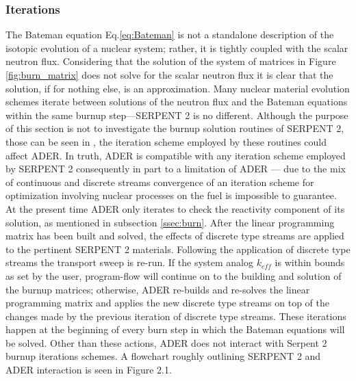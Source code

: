 \subsubsection{Iterations} \label{sssec:iter}
The Bateman equation Eq.\ref{eq:Bateman} is not a standalone description of the
isotopic evolution of a nuclear system; rather, it is tightly coupled with the
scalar neutron flux. Considering that the solution of the system of matrices
in Figure \ref{fig:burn_matrix} does not solve for the scalar neutron flux
it is clear that the solution, if for nothing else, is an approximation. Many
nuclear material evolution schemes iterate between solutions of the neutron
flux and the Bateman equations within the same burnup step---SERPENT 2 is no 
different. Although the purpose of
this section is not to investigate the burnup solution routines of SERPENT 2, 
those
can be seen in \cite{leppanen_burnup_2009}, the iteration scheme employed by
these routines could affect ADER. In truth, ADER is compatible with any
iteration scheme employed by SERPENT 2 consequently in part to a limitation 
of ADER ---
due to the mix of continuous and discrete streams convergence of an iteration
scheme for optimization involving nuclear processes on the fuel is impossible
to guarantee. At the present time ADER only iterates to check the reactivity 
component of its solution, as mentioned in subsection \ref{ssec:burn}. 
After the linear programming
matrix has been built and solved, the effects of discrete type streams are
applied to the pertinent SERPENT 2 materials. Following the application 
of discrete type streams the transport sweep is re-run. If the system analog 
$k_{eff}$ is within bounds as set by the user, program-flow will continue on to
the building and solution of the burnup matrices; otherwise, ADER re-builds
and re-solves the linear programming matrix and applies the new discrete type
streams on top of the changes made by the previous iteration of discrete 
type streams. These iterations happen at the beginning of every burn step in 
which the Bateman equations will be solved. Other than these actions, ADER 
does not
interact with Serpent 2 burnup iterations schemes. A flowchart roughly outlining
SERPENT 2 and ADER interaction is seen in Figure 2.1.

